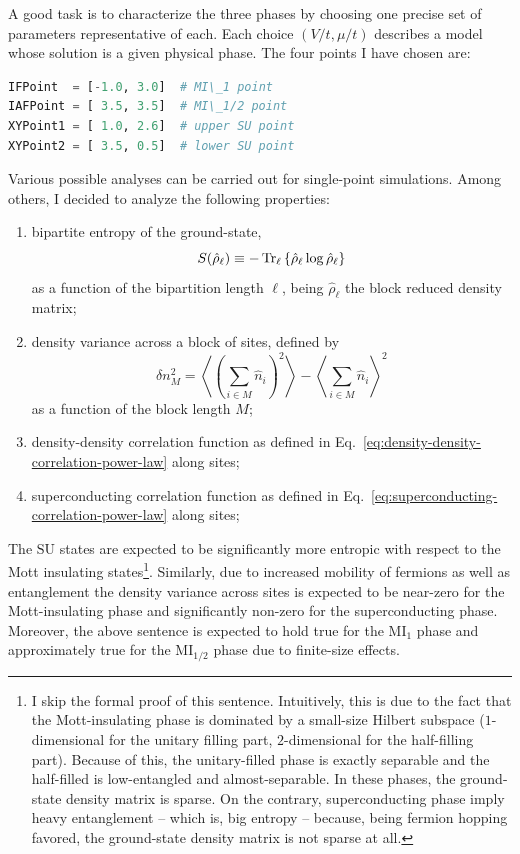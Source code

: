 A good task is to characterize the three phases by choosing one precise set of parameters representative of each. Each choice $(V/t,\mu/t)$ describes a model whose solution is a given physical phase. The four points I have chosen are:
\begin{lstlisting}[language=julia]
IFPoint  = [-1.0, 3.0]	# MI\_1 point
IAFPoint = [ 3.5, 3.5]	# MI\_1/2 point
XYPoint1 = [ 1.0, 2.6]	# upper SU point
XYPoint2 = [ 3.5, 0.5]	# lower SU point
\end{lstlisting}
Various possible analyses can be carried out for single-point simulations. Among others, I decided to analyze the following properties:
\begin{enumerate}
	\item bipartite entropy of the ground-state,
	\begin{equation}\label{eq:bipartite-entropy-definition}
		S(\hat \rho_\ell) \equiv - \Tr_\ell \left\lbrace \hat \rho_\ell \log \hat \rho_\ell \right\rbrace
	\end{equation}
	as a function of the bipartition length $\ell$, being $\hat \rho_\ell$ the block reduced density matrix;
	\item density variance across a block of sites, defined by
	\begin{equation}\label{eq:density-block-variance-definition}
		\delta n_M^2 = \left\langle \left( \sum_{i \in M} \hat n_i \right)^2 \right\rangle - \left\langle \sum_{i \in M} \hat n_i \right\rangle^2
	\end{equation}
	as a function of the block length $M$;
	\item density-density correlation function as defined in Eq.~\eqref{eq:density-density-correlation-power-law} along sites;
	\item superconducting correlation function as defined in Eq.~\eqref{eq:superconducting-correlation-power-law} along sites;
\end{enumerate}
The $\mathrm{SU}$ states are expected to be significantly more entropic with respect to the Mott insulating states\footnote{
	I skip the formal proof of this sentence. Intuitively, this is due to the fact that the Mott-insulating phase is dominated by a small-size Hilbert subspace ($1$-dimensional for the unitary filling part, $2$-dimensional for the half-filling part). Because of this, the unitary-filled phase is exactly separable and the half-filled is low-entangled and almost-separable. In these phases, the ground-state density matrix is sparse. On the contrary, superconducting phase imply heavy entanglement -- which is, big entropy -- because, being fermion hopping favored, the ground-state density matrix is not sparse at all.
}. Similarly, due to increased mobility of fermions as well as entanglement the density variance across sites is expected to be near-zero for the Mott-insulating phase and significantly non-zero for the superconducting phase. Moreover, the above sentence is expected to hold true for the $\mathrm{MI}_1$ phase and approximately true for the $\mathrm{MI}_{1/2}$ phase due to finite-size effects.

